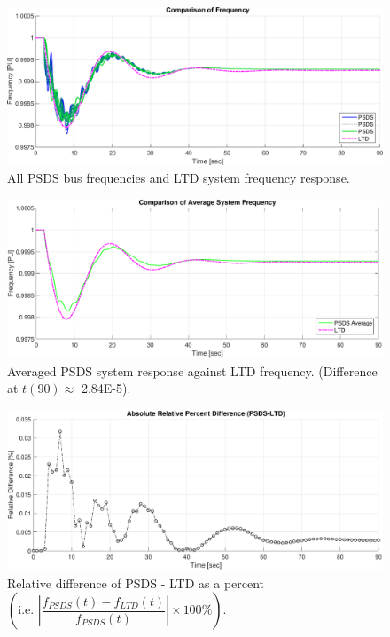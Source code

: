 \documentclass[12pt]{article}
\newcommand{\figW}{1}
\newcommand{\figH}{.26}
\begin{document}
	\begin{figure}[h!]
			\centering
			\includegraphics[width=\figW\linewidth,height=\figH\textheight]{fcomp.png}\vspace{-1em}
			\caption{All PSDS bus frequencies and LTD system frequency response.}
			\label{fcomp}		 
	\end{figure}\vspace{-2em}
	\begin{figure}[h!]
				\centering
				\includegraphics[width=\figW\linewidth,height=\figH\textheight]{aveFg}  \vspace{-2em}
				\caption{Averaged PSDS system response against LTD frequency. (Difference at $t(90) \approx$ 2.84E-5).} 
				\label{aveF}
	\end{figure}\vspace{-2em}
	\begin{figure}[h!]	
				\centering
				\includegraphics[width=\figW\linewidth,height=\figH\textheight]{relDif}  \vspace{-1.5em}
				\caption{Relative difference of PSDS - LTD as a percent $\left( \text{i.e. }  \left|\dfrac{f_{PSDS}(t)- f_{LTD}(t)}{f_{PSDS}(t)}\right| \times 100\% \right)$.}
				\label{redDif}
	\end{figure}
\end{document}

